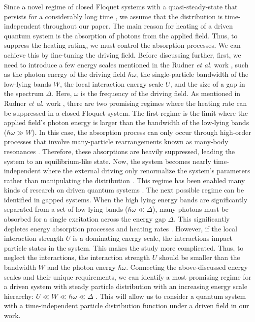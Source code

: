 \documentclass{article}
\begin{document}
Since a novel regime of closed Floquet systems with a quasi-steady-state that persists for a considerably long time \cite{lindner2017}, we assume that the distribution is time-independent throughout our paper. The main reason for  heating of a driven quantum system is the absorption of photons from the applied field. Thus, to suppress the heating rating, we must control the absorption processes. We can achieve this by fine-tuning the driving field. Before discussing further, first, we need to introduce a few energy scales mentioned in the Rudner \textit{et al.} work \cite{rudner2020}, such as the photon energy of the driving field $\hbar\omega$, the single-particle bandwidth of the low-lying bands $W$, the local interaction energy scale $U$, and the size of a gap in the spectrum $\Delta$.  Here, $\omega$ is the frequency of the driving field.
As mentioned in Rudner \textit{et al.} work \cite{rudner2020}, there are two promising regimes where the heating rate can be suppressed in a closed Floquet system. The first regime is the limit where the applied field's photon energy is larger than the bandwidth of the low-lying bands ($\hbar\omega \gg W$). In this case, the absorption process can only occur through high-order processes that involve many-particle rearrangements known as many-body resonances  \cite{bukov2016,lindner2017,rudner2020}. Therefore, these absorptions are heavily suppressed, leading the system to an equilibrium-like
state. Now, the system becomes nearly time-independent where the external driving only renormalize the system's parameters rather than manipulating the distribution \cite{wackerlthesis20}.
This regime has been enabled many kinds of research on driven quantum systems \cite{kitagawa2011,lopez2015,pervishko2015,bukov2015,yudin2016}.
The next possible regime can be identified in gapped systems. When the high lying energy bands are significantly separated from a set of low-lying bands ($\hbar\omega \ll \Delta$), many photons must be absorbed for a single excitation across the energy gap $\Delta$. This significantly depletes energy absorption processes and heating rates \cite{rudner2020}. However, if the local interaction strength $U$ is a dominating energy scale, the interactions impact particle states in the system. This makes the study more complicated. Thus, to neglect the interactions, the interaction strength $U$ should be smaller than  the bandwidth $W$ and the photon energy $\hbar\omega$. Connecting the above-discussed energy scales and their unique requirements, we can identify a most promising regime for a driven system with steady particle distribution with an increasing energy scale hierarchy: $U \ll W \ll \hbar\omega \ll \Delta$ \cite{rudner2020,wackerlthesis20}. This will allow us to consider a quantum system with a time-independent particle distribution function under a driven field in our work.
\end{document}
